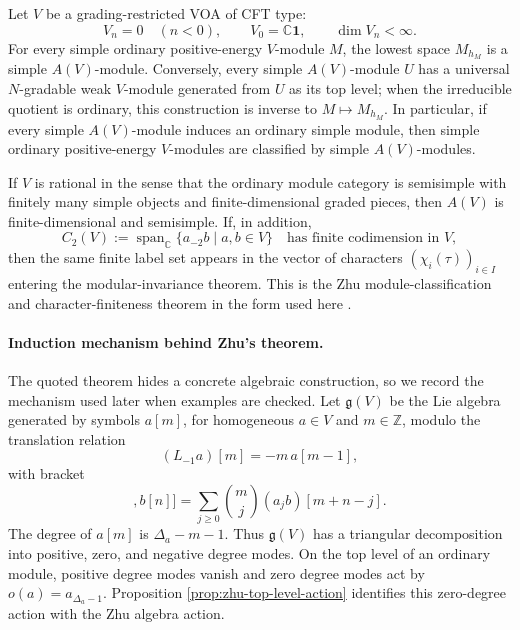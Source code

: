 \begin{quotedtheorem}
\label{qthm:zhu-classification}
Let \(V\) be a grading-restricted VOA of CFT type:
\[
  V_n=0\quad(n<0),\qquad V_0=\mathbb C\mathbf 1,\qquad
  \dim V_n<\infty .
\]
For every simple ordinary positive-energy \(V\)-module \(M\), the lowest
space \(M_{h_M}\) is a simple \(A(V)\)-module.  Conversely, every simple
\(A(V)\)-module \(U\) has a universal \(N\)-gradable weak \(V\)-module
generated from \(U\) as its top level; when the irreducible quotient is
ordinary, this construction is inverse to \(M\mapsto M_{h_M}\).  In
particular, if every simple \(A(V)\)-module induces an ordinary simple module,
then simple ordinary positive-energy \(V\)-modules are classified by simple
\(A(V)\)-modules.

If \(V\) is rational in the sense that the ordinary module category is
semisimple with finitely many simple objects and finite-dimensional graded
pieces, then \(A(V)\) is finite-dimensional and semisimple.  If, in addition,
\[
  C_2(V):=\operatorname{span}_{\mathbb C}\{a_{-2}b\mid a,b\in V\}
  \quad\text{has finite codimension in }V,
\]
then the same finite label set appears in the vector of characters
\((\chi_i(\tau))_{i\in I}\) entering the modular-invariance theorem.
This is the Zhu module-classification and character-finiteness theorem in the
form used here \cite{Zhu1996}.
\end{quotedtheorem}

\paragraph{Induction mechanism behind Zhu's theorem.}
The quoted theorem hides a concrete algebraic construction, so we record the
mechanism used later when examples are checked.  Let \(\mathfrak g(V)\) be
the Lie algebra generated by symbols \(a[m]\), for homogeneous \(a\in V\) and
\(m\in\mathbb Z\), modulo the translation relation
\[
  (L_{-1}a)[m]=-m\,a[m-1],
\]
with bracket
\begin{equation}
  [a[m],b[n]]
  =
  \sum_{j\ge0}\binom{m}{j}(a_jb)[m+n-j].
  \label{eq:zhu-mode-lie-algebra-bracket}
\end{equation}
The degree of \(a[m]\) is \(\Delta_a-m-1\).  Thus \(\mathfrak g(V)\) has a
triangular decomposition into positive, zero, and negative degree modes.  On
the top level of an ordinary module, positive degree modes vanish and zero
degree modes act by \(o(a)=a_{\Delta_a-1}\).  Proposition
\ref{prop:zhu-top-level-action} identifies this zero-degree action with the
Zhu algebra action.


